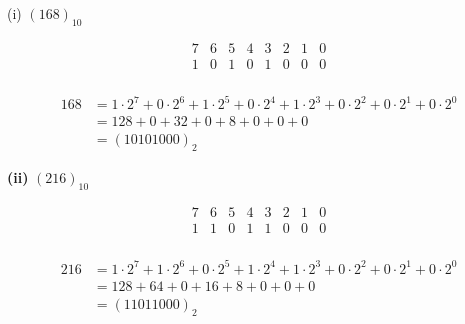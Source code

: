 \documentclass[
  a4paper,
]{article}
\begin{document}
(i) \((168)_{10}\)

\[
\begin{matrix}
7 & 6 & 5 & 4 & 3 & 2 & 1 & 0 \\
1 & 0 & 1 & 0 & 1 & 0 & 0 & 0 \\
\end{matrix}
\]

\begin{align*}
168 &= 1\cdot 2^7 + 0\cdot 2^6 + 1\cdot 2^5 + 0\cdot 2^4 + 1\cdot 2^3 + 0\cdot 2^2 + 0\cdot 2^1 + 0\cdot 2^0 \\
&= 128 + 0 + 32 + 0 + 8 + 0 + 0 + 0 \\
&= \boxed{(10101000)_2}
\end{align*}

\textbf{(ii)} \((216)_{10}\)

\[
\begin{matrix}
7 & 6 & 5 & 4 & 3 & 2 & 1 & 0 \\
1 & 1 & 0 & 1 & 1 & 0 & 0 & 0 \\
\end{matrix}
\]

\begin{align*}
216 &= 1\cdot 2^7 + 1\cdot 2^6 + 0\cdot 2^5 + 1\cdot 2^4 + 1\cdot 2^3 + 0\cdot 2^2 + 0\cdot 2^1 + 0\cdot 2^0 \\
&= 128 + 64 + 0 + 16 + 8 + 0 + 0 + 0 \\
&= \boxed{(11011000)_2}
\end{align*}
\end{document}
